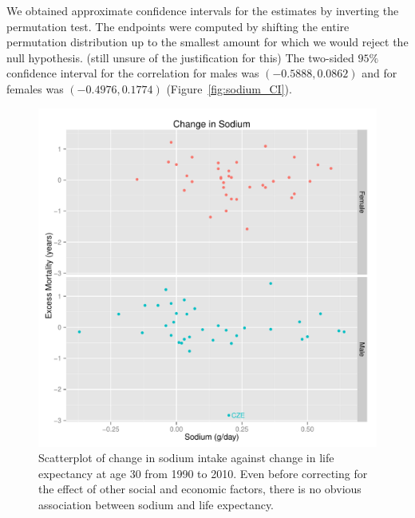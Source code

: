\documentclass{article}
\begin{document}
We obtained approximate confidence intervals for the estimates by inverting the permutation test.  The endpoints were computed by shifting the entire permutation distribution up to the smallest amount for which we would reject the null hypothesis. (still unsure of the justification for this) The two-sided $95\%$ confidence interval for the correlation for males was $(-0.5888, 0.0862)$ and for females was $(-0.4976, 0.1774)$ (Figure~\ref{fig:sodium_CI}).


\begin{figure}
\centering
\includegraphics[width = \textwidth]{sodium_exmort.pdf}
\caption{Scatterplot of change in sodium intake against change in life expectancy at age 30 from 1990 to 2010. Even before correcting for the effect of other social and economic factors, there is no obvious association between sodium and life expectancy.}\label{fig:sodium_excessmortality}
\end{figure}
\end{document}
